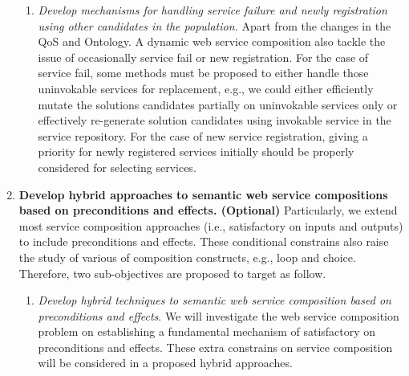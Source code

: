 \begin{enumerate}
\begin{enumerate}
 
 
 \item \emph{Develop mechanisms for handling service failure and newly registration using other candidates in the population.} Apart from the changes in the QoS and Ontology. A dynamic web service composition also tackle the issue of occasionally service fail or new registration. For the case of service fail, some methods must be proposed to either handle those uninvokable services for replacement, e.g., we could either efficiently mutate the solutions candidates partially on uninvokable services only or effectively re-generate solution candidates using invokable service in the service repository. For the case of new service registration, giving a priority for newly registered services initially should be properly considered for selecting services.
 
 \end{enumerate}
 
 
 
 
 \item \textbf{Develop hybrid approaches to semantic web service compositions based on preconditions and effects. (Optional)} Particularly, we extend most service composition approaches (i.e., satisfactory on inputs and outputs) to include preconditions and effects. These conditional constrains also raise the study of various of composition constructs, e.g., loop and choice. Therefore, two sub-objectives are proposed to target as follow.
 \begin{enumerate}
 
  \item \emph{Develop hybrid techniques to semantic web service composition based on preconditions and effects}. We will investigate the web service  composition problem on establishing a fundamental mechanism of satisfactory on preconditions and effects. These extra constrains on service composition will be considered in a proposed hybrid approaches.
  

\end{enumerate}
\end{enumerate}
